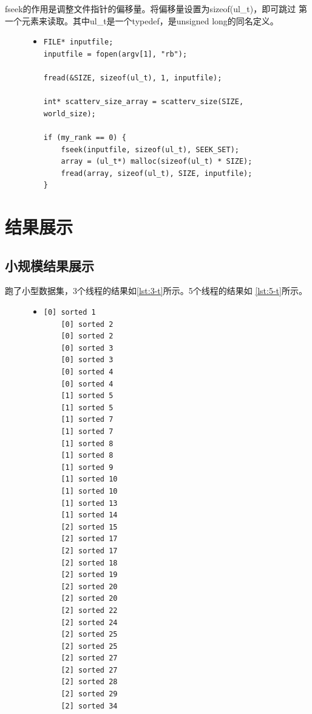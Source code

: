 \documentclass[a4paper]{article}
\begin{document}
fseek的作用是调整文件指针的偏移量。将偏移量设置为sizeof(ul\_t)，即可跳过
第一个元素来读取。其中ul\_t是一个typedef，是unsigned long的同名定义。
\begin{figure}[!hbt]
\begin{itemize}
\item[] \begin{lstlisting}[style=mycpp, label=lst:readdata, caption=读取数据的代码]
FILE* inputfile;
inputfile = fopen(argv[1], "rb");

fread(&SIZE, sizeof(ul_t), 1, inputfile);

int* scatterv_size_array = scatterv_size(SIZE, world_size);

if (my_rank == 0) {
    fseek(inputfile, sizeof(ul_t), SEEK_SET);
    array = (ul_t*) malloc(sizeof(ul_t) * SIZE);
    fread(array, sizeof(ul_t), SIZE, inputfile);
}
\end{lstlisting}
\end{itemize}
\end{figure}


\section{结果展示}
\subsection{小规模结果展示}
跑了小型数据集，3个线程的结果如\autoref{lst:3-t}所示。5个线程的结果如
\autoref{lst:5-t}所示。
\begin{figure}[!hbt]
\begin{itemize}
\item[] \begin{lstlisting}[style=mycpp, label=lst:3-t, caption=三线程结果]
    [0] sorted 1
    [0] sorted 2
    [0] sorted 2
    [0] sorted 3
    [0] sorted 3
    [0] sorted 4
    [0] sorted 4
    [1] sorted 5
    [1] sorted 5
    [1] sorted 7
    [1] sorted 7
    [1] sorted 8
    [1] sorted 8
    [1] sorted 9
    [1] sorted 10
    [1] sorted 10
    [1] sorted 13
    [1] sorted 14
    [2] sorted 15
    [2] sorted 17
    [2] sorted 17
    [2] sorted 18
    [2] sorted 19
    [2] sorted 20
    [2] sorted 20
    [2] sorted 22
    [2] sorted 24
    [2] sorted 25
    [2] sorted 25
    [2] sorted 27
    [2] sorted 27
    [2] sorted 28
    [2] sorted 29
    [2] sorted 34
\end{lstlisting}
\end{itemize}
\end{figure}
\end{document}
